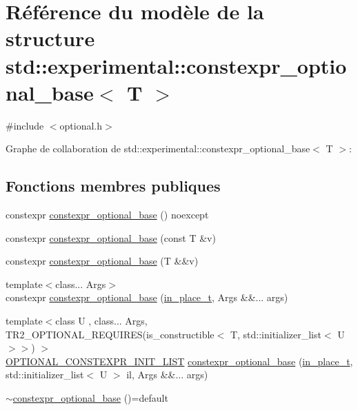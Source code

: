\hypertarget{structstd_1_1experimental_1_1constexpr__optional__base}{}\section{Référence du modèle de la structure std\+:\+:experimental\+:\+:constexpr\+\_\+optional\+\_\+base$<$ T $>$}
\label{structstd_1_1experimental_1_1constexpr__optional__base}


{\ttfamily \#include $<$optional.\+h$>$}



Graphe de collaboration de std\+:\+:experimental\+:\+:constexpr\+\_\+optional\+\_\+base$<$ T $>$\+:
\subsection*{Fonctions membres publiques}
\begin{DoxyCompactItemize}
\item 
constexpr \hyperlink{structstd_1_1experimental_1_1constexpr__optional__base_a2de68e8d50f3b54344372c96c2123327}{constexpr\+\_\+optional\+\_\+base} () noexcept
\item 
constexpr \hyperlink{structstd_1_1experimental_1_1constexpr__optional__base_a215e82b0c75a04e871f55ab74def5653}{constexpr\+\_\+optional\+\_\+base} (const T \&v)
\item 
constexpr \hyperlink{structstd_1_1experimental_1_1constexpr__optional__base_a7a1c2735a3d7c86bdd4e179f9e291444}{constexpr\+\_\+optional\+\_\+base} (T \&\&v)
\item 
{\footnotesize template$<$class... Args$>$ }\\constexpr \hyperlink{structstd_1_1experimental_1_1constexpr__optional__base_a0ad7ea00451f21b435d46658be3eace6}{constexpr\+\_\+optional\+\_\+base} (\hyperlink{structstd_1_1experimental_1_1in__place__t}{in\+\_\+place\+\_\+t}, Args \&\&... args)
\item 
{\footnotesize template$<$class U , class... Args, T\+R2\+\_\+\+O\+P\+T\+I\+O\+N\+A\+L\+\_\+\+R\+E\+Q\+U\+I\+R\+E\+S(is\+\_\+constructible$<$ T, std\+::initializer\+\_\+list$<$ U $>$$>$) $>$ }\\\hyperlink{optional_8h_a7399114ed1c146a67741cdd1f681fcb5}{O\+P\+T\+I\+O\+N\+A\+L\+\_\+\+C\+O\+N\+S\+T\+E\+X\+P\+R\+\_\+\+I\+N\+I\+T\+\_\+\+L\+I\+ST} \hyperlink{structstd_1_1experimental_1_1constexpr__optional__base_aca7f761fe8d8a0e12295a590ff901654}{constexpr\+\_\+optional\+\_\+base} (\hyperlink{structstd_1_1experimental_1_1in__place__t}{in\+\_\+place\+\_\+t}, std\+::initializer\+\_\+list$<$ U $>$ il, Args \&\&... args)
\item 
\hyperlink{structstd_1_1experimental_1_1constexpr__optional__base_aa45afb4ed80eab963e850ca337956a95}{$\sim$constexpr\+\_\+optional\+\_\+base} ()=default
\end{DoxyCompactItemize}
